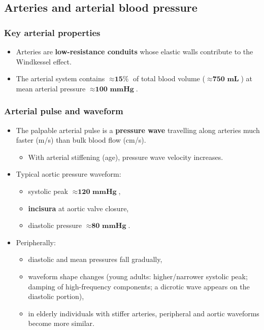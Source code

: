 \documentclass[11pt,a4paper]{article}
\begin{document}
\subsection{Arteries and arterial blood pressure}

\subsubsection{Key arterial properties}
\begin{itemize}
\item Arteries are \textbf{low-resistance conduits} whose elastic walls contribute to the Windkessel effect.
\item The arterial system contains $\approx \textbf{15\%}$ of total blood volume ($\approx \textbf{750 mL}$) at mean arterial pressure $\approx \textbf{100 mmHg}$.
\end{itemize}

\subsubsection{Arterial pulse and waveform}
\begin{itemize}
\item The palpable arterial pulse is a \textbf{pressure wave} travelling along arteries much faster (m/s) than bulk blood flow (cm/s).
  \begin{itemize}
  \item With arterial stiffening (age), pressure wave velocity increases.
  \end{itemize}
\item Typical aortic pressure waveform:
  \begin{itemize}
  \item systolic peak $\approx \textbf{120 mmHg}$,
  \item \textbf{incisura} at aortic valve closure,
  \item diastolic pressure $\approx \textbf{80 mmHg}$.
  \end{itemize}
\item Peripherally:
  \begin{itemize}
  \item diastolic and mean pressures fall gradually,
  \item waveform shape changes (young adults: higher/narrower systolic peak; damping of high-frequency components; a dicrotic wave appears on the diastolic portion),
  \item in elderly individuals with stiffer arteries, peripheral and aortic waveforms become more similar.
  \end{itemize}
\end{itemize}
\end{document}
